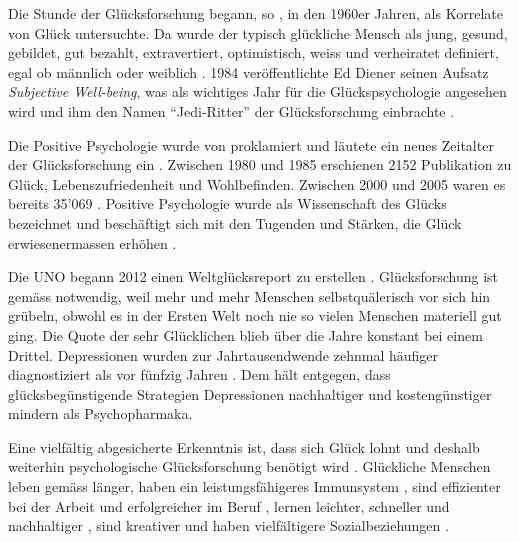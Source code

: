 Die Stunde der Glücksforschung begann, so , in den 1960er Jahren, als  Korrelate von Glück untersuchte. Da wurde der typisch glückliche Mensch als jung, gesund, gebildet, gut bezahlt, extravertiert, optimistisch, weiss und verheiratet definiert, egal ob männlich oder weiblich \cite{Bucher2009}. 1984 veröffentlichte Ed Diener \cite{Diener1984} seinen Aufsatz \textit{Subjective Well-being}, was als wichtiges Jahr für die Glückspsychologie angesehen wird und ihm den Namen \enquote{Jedi-Ritter} der Glücksforschung einbrachte \cite{Metzger2010}.

Die Positive Psychologie wurde von  proklamiert und läutete ein neues Zeitalter der Glücksforschung ein \cite{Bucher2009}. Zwischen 1980 und 1985 erschienen 2152 Publikation zu Glück, Lebenszufriedenheit und Wohlbefinden. Zwischen 2000 und 2005 waren es bereits 35'069 \cite{Donaldson2014}. Positive Psychologie wurde als Wissenschaft des Glücks bezeichnet \cite{Carr2011} und beschäftigt sich mit den Tugenden und Stärken, die Glück erwiesenermassen erhöhen \cite{Peterson2004}.

Die UNO begann 2012 einen Weltglücksreport zu erstellen \cite{Helliwell2013}. Glücksforschung ist gemäss  notwendig, weil mehr und mehr Menschen selbstquälerisch vor sich hin grübeln, obwohl es in der Ersten Welt noch nie so vielen Menschen materiell gut ging. Die Quote der sehr Glücklichen blieb über die Jahre konstant bei einem Drittel. Depressionen wurden zur Jahrtausendwende zehnmal häufiger diagnostiziert als vor fünfzig Jahren \cite{Seligman2009}. Dem hält  entgegen, dass glücksbegünstigende Strategien Depressionen nachhaltiger und kostengünstiger mindern als Psychopharmaka.

Eine vielfältig abgesicherte Erkenntnis ist, dass sich Glück lohnt und deshalb weiterhin psychologische Glücksforschung benötigt wird \cite{Lyubomirsky2005}. Glückliche Menschen leben gemäss  länger, haben ein leistungsfähigeres Immunsystem \cite{Barak2006}, sind effizienter bei der Arbeit und erfolgreicher im Beruf \cite{Achor2010}, lernen leichter, schneller und nachhaltiger \cite{Endres2014}, sind kreativer \cite{Baas2008} und haben vielfältigere Sozialbeziehungen \cite{Rodriguez2014}.



